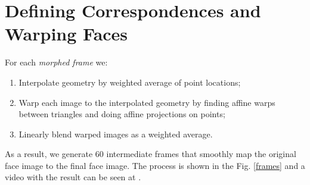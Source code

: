 \documentclass[11pt]{article}
\begin{document}
\newpage


\section{Defining Correspondences and Warping Faces}

For each {\it morphed frame} we:

\begin{enumerate}
\item Interpolate geometry by weighted average of point locations;
\item Warp each image to the interpolated geometry by finding affine warps between triangles and doing affine projections on points;
\item Linearly blend warped images as a weighted average.
\end{enumerate}

\quad

As a result, we generate 60 intermediate frames that smoothly map the original face image to the final face image. The process is shown in the Fig. \ref{frames} and a video with the result can be seen at \cite{video-face}.
\end{document}
